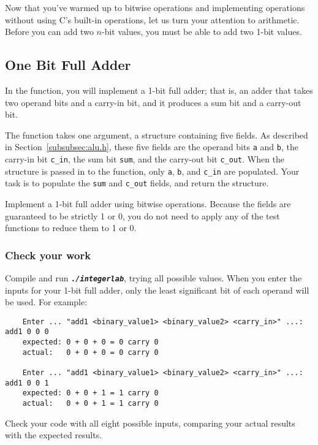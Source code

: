 Now that you've warmed up to bitwise operations and implementing operations without using C's built-in operations, let us turn your attention to arithmetic.
Before you can add two $n$-bit values, you must be able to add two 1-bit values.

\subsection{One Bit Full Adder} \label{subsec:one-bit-full-adder}

In the  function, you will implement a 1-bit full adder;
that is, an adder that takes two operand bits and a carry-in bit, and it produces a sum bit and a carry-out bit.

The function takes one argument, a structure containing five fields.
As described in Section~\ref{subsubsec:alu.h}, these five fields are the operand bits \lstinline{a} and \lstinline{b}, the carry-in bit \lstinline{c_in}, the sum bit \lstinline{sum}, and the carry-out bit \lstinline{c_out}.
When the structure is passed in to the function, only \lstinline{a}, \lstinline{b}, and \lstinline{c_in} are populated.
Your task is to populate the \lstinline{sum} and \lstinline{c_out} fields, and return the structure.

Implement a 1-bit full adder using bitwise operations.
Because the fields are guaranteed to be strictly 1 or 0, you do not need to apply any of the test functions to reduce them to 1 or 0.

\subsubsection*{Check your work}

Compile and run \texttt{\textbf{\textit{./integerlab}}}, trying all possible values.
When you enter the inputs for your 1-bit full adder, only the least significant bit of each operand will be used.
For example:
\begin{verbatim}
    Enter ... "add1 <binary_value1> <binary_value2> <carry_in>" ...: add1 0 0 0
    expected: 0 + 0 + 0 = 0 carry 0
    actual:   0 + 0 + 0 = 0 carry 0

    Enter ... "add1 <binary_value1> <binary_value2> <carry_in>" ...: add1 0 0 1
    expected: 0 + 0 + 1 = 1 carry 0
    actual:   0 + 0 + 1 = 1 carry 0
\end{verbatim}

Check your code with all eight possible inputs, comparing your actual results with the expected results.


